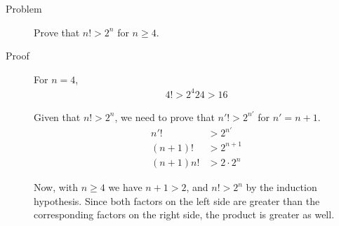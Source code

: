 \begin{description}
\item[Problem] Prove that $n! > 2^n$ for $n \ge 4$.
\item[Proof] For $n = 4$,
\begin{equation*}\begin{aligned}
4! > 2^4
24 > 16
\end{aligned}\end{equation*}

Given that $n! > 2^n$, we need to prove that $n'! > 2^{n'}$ for $n' = n + 1$.
\begin{equation*}\begin{aligned}
n'! &> 2^{n'} \\
(n+1)! &> 2^{n+1} \\
(n+1)n! &> 2 \cdot 2^n
\end{aligned}\end{equation*}

Now, with $n \ge 4$ we have $n + 1 > 2$, and $n! > 2^n$ by the induction
hypothesis. Since both factors on the left side are greater than the
corresponding factors on the right side, the product is greater as well.

\end{description}
